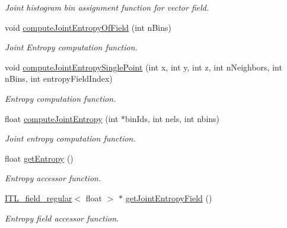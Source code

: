 \begin{DoxyCompactItemize}
\begin{DoxyCompactList}\small\item\em Joint histogram bin assignment function for vector field. \item\end{DoxyCompactList}\item 
void \hyperlink{classITL__localjointentropy_a61e8069fb43ede8ff287ec52b7ac3209}{computeJointEntropyOfField} (int nBins)
\begin{DoxyCompactList}\small\item\em Joint Entropy computation function. \item\end{DoxyCompactList}\item 
void \hyperlink{classITL__localjointentropy_addf9e3b48606d41d21d3f8de92e301dc}{computeJointEntropySinglePoint} (int x, int y, int z, int nNeighbors, int nBins, int entropyFieldIndex)
\begin{DoxyCompactList}\small\item\em Entropy computation function. \item\end{DoxyCompactList}\item 
float \hyperlink{classITL__localjointentropy_a55d22392f68f774dc49ba7ee1d63f5e4}{computeJointEntropy} (int $\ast$binIds, int nels, int nbins)
\begin{DoxyCompactList}\small\item\em Joint entropy computation function. \item\end{DoxyCompactList}\item 
float \hyperlink{classITL__localjointentropy_a340a81aab892167d4e1237a2c8dc32f4}{getEntropy} ()
\begin{DoxyCompactList}\small\item\em Entropy accessor function. \item\end{DoxyCompactList}\item 
\hyperlink{classITL__field__regular}{ITL\_\-field\_\-regular}$<$ float $>$ $\ast$ \hyperlink{classITL__localjointentropy_a6692663398468a38585e53b005fef179}{getJointEntropyField} ()
\begin{DoxyCompactList}\small\item\em Entropy field accessor function. \item\end{DoxyCompactList}\end{DoxyCompactItemize}
